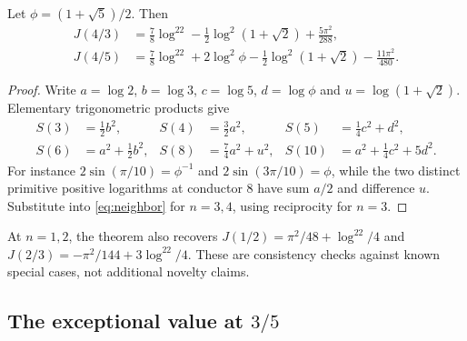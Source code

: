 \begin{corollary}\label{cor:small-J}
Let $\phi=(1+\sqrt5)/2$. Then
\begin{align}
 J(4/3)&=\frac78\log^22-\frac12\log^2(1+\sqrt2)
                     +\frac{5\pi^2}{288},\label{eq:J43}\\
 J(4/5)&=\frac78\log^22+2\log^2\phi
              -\frac12\log^2(1+\sqrt2)-\frac{11\pi^2}{480}.
 \label{eq:J45}
\end{align}
\end{corollary}
\begin{proof}
Write $a=\log2$, $b=\log3$, $c=\log5$, $d=\log\phi$ and
$u=\log(1+\sqrt2)$. Elementary trigonometric products give
\begin{align*}
 S(3)&=\tfrac12b^2,&S(4)&=\tfrac32a^2,&
 S(5)&=\tfrac14c^2+d^2,\\
 S(6)&=a^2+\tfrac12b^2,&S(8)&=\tfrac74a^2+u^2,&
 S(10)&=a^2+\tfrac14c^2+5d^2.
\end{align*}
For instance $2\sin(\pi/10)=\phi^{-1}$ and
$2\sin(3\pi/10)=\phi$, while the two distinct primitive positive
logarithms at conductor $8$ have sum $a/2$ and difference $u$.
Substitute into \eqref{eq:neighbor} for $n=3,4$, using reciprocity for
$n=3$.
\end{proof}

At $n=1,2$, the theorem also recovers
$J(1/2)=\pi^2/48+\log^22/4$ and
$J(2/3)=-\pi^2/144+3\log^22/4$. These are consistency checks against
known special cases, not additional novelty claims.

\subsection{The exceptional value at \texorpdfstring{$3/5$}{3/5}}

